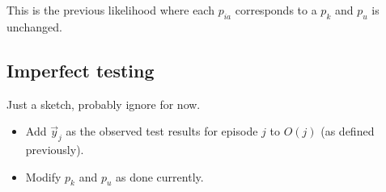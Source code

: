 \documentclass[thesis.tex]{subfiles}
\begin{document}
This is the previous likelihood where each $p_{ia}$ corresponds to a $p_k$ and $p_u$ is unchanged.

\subsection{Imperfect testing}

Just a sketch, probably ignore for now.

\begin{itemize}
  \item Add $\vec{y}_j$ as the observed test results for episode $j$ to $O(j)$ (as defined previously).
  \item Modify $p_k$ and $p_u$ as done currently.
\end{itemize}
\end{document}
